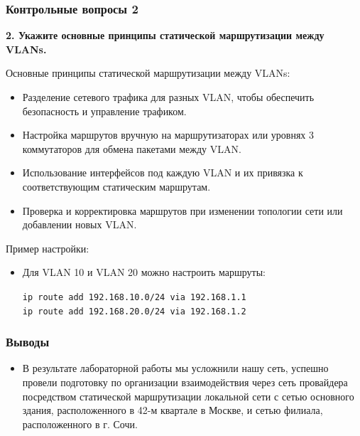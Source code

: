 \begin{frame}
\frametitle{Контрольные вопросы 2}
\textbf{2. Укажите основные принципы статической маршрутизации между VLANs.}

Основные принципы статической маршрутизации между VLANs:
\begin{itemize}
\item Разделение сетевого трафика для разных VLAN, чтобы обеспечить безопасность и управление трафиком.
\item Настройка маршрутов вручную на маршрутизаторах или уровнях 3 коммутаторов для обмена пакетами между VLAN.
\item Использование интерфейсов под каждую VLAN и их привязка к соответствующим статическим маршрутам.
\item Проверка и корректировка маршрутов при изменении топологии сети или добавлении новых VLAN.
\end{itemize}

Пример настройки:
\begin{itemize}
\item Для VLAN 10 и VLAN 20 можно настроить маршруты:
\begin{center}
\texttt{ip route add 192.168.10.0/24 via 192.168.1.1} \\
\texttt{ip route add 192.168.20.0/24 via 192.168.1.2}
\end{center}
\end{itemize}
\end{frame}
\begin{frame}
\frametitle{Выводы}
\begin{itemize}
    \item В результате лабораторной работы мы усложнили нашу сеть, успешно провели подготовку по организации взаимодействия через сеть провайдера посредством статической маршрутизации локальной сети с сетью основного здания, расположенного в 42-м квартале в Москве, и сетью филиала, расположенного в г. Сочи.
\end{itemize}
\end{frame}


